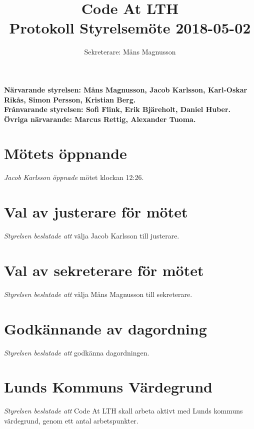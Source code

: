 \documentclass{article}
\newcommand{\sekreterare}{M\aa ns Magnusson}
\newcommand{\datum}{2018-05-02}
\begin{document}
\title{
  \Huge{Code At LTH} \\
Protokoll Styrelsemöte \datum}
\author{ Sekreterare: \sekreterare}
\date{}
\maketitle
\thispagestyle{first}

{\bf Närvarande styrelsen: Måns Magnusson, Jacob Karlsson, Karl-Oskar Rikås, Simon Persson, Kristian Berg.}  \\
{\bf Frånvarande styrelsen: Sofi Flink, Erik Bjäreholt, Daniel Huber.} \\
{\bf Övriga närvarande: Marcus Rettig, Alexander Tuoma.} \\

\section{Mötets öppnande}
\emph{Jacob Karlsson öppnade} mötet klockan 12:26.

\section{Val av justerare för mötet} 
\emph{Styrelsen beslutade att} välja Jacob Karlsson till justerare.

\section{Val av sekreterare för mötet} 
\emph{Styrelsen beslutade att} välja Måns Magnusson till sekreterare.

\section{Godkännande av dagordning}
\emph{Styrelsen beslutade att} godkänna dagordningen.

\section{Lunds Kommuns Värdegrund}
\emph{Styrelsen beslutade att} Code At LTH skall arbeta aktivt med Lunds kommuns värdegrund, genom ett antal arbetspunkter.
\end{document}
